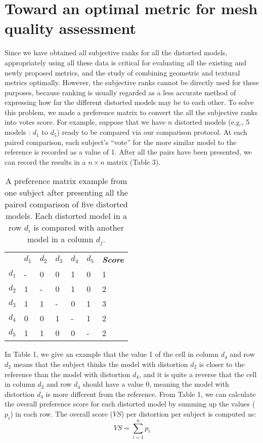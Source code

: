 \section{Toward an optimal metric for mesh quality assessment}
Since we have obtained all subjective ranks for all the distorted models, appropriately using all these data is critical for evaluating all the existing and newly proposed metrics, and the study of combining geometric and textural metrics optimally. However, the subjective ranks cannot be directly used for these purposes, because ranking is usually regarded as a less accurate method of expressing how far the different distorted models may be to each other.  To solve this problem, we made a preference matrix \cite{Ledda_2005} to convert the all the subjective ranks into votes score. For example, suppose that we have $n$ distorted models (e.g., 5 models : $d_1$ to $d_5$) ready to be compared via our comparison protocol.   At each paired comparison, each subject’s “vote” for the more similar model to the reference is recorded as a value of 1. After all the pairs have been presented, we can record the results in a $n \times n$ matrix (Table 3).
\begin{table}[]
\centering
\caption{A preference matrix example from one subject after presenting all the paired comparison of five distorted models. Each distorted model in a row $d_i$ is compared with another model in a column $d_j$.}
\label{my-label}
\begin{tabular}{lllllll}
            & $d_1$ & $d_2$ & $d_3$ & $d_4$ & $d_5$ & \textit{\textbf{Score}} \\
$d_1$ & -           & 0           & 0           & 1           & 0           & 1     \\
$d_2$ & 1           & -           & 0           & 1           & 0           & 2     \\
$d_3$ & 1           & 1           & -           & 0           & 1           & 3     \\
$d_4$ & 0           & 0           & 1           & -           & 1           & 2     \\
$d_5$ & 1           & 1           & 0           & 0           & -           & 2    
\end{tabular}
\end{table}
In Table 1, we give an example that the value 1 of the cell in column $d_4$ and row $d_2$ means that the subject thinks the model with distortion $d_2$ is closer to the reference than the model with distortion $d_4$, and it is quite a reverse that the cell in column $d_2$ and row $d_4$ should have a value 0, meaning the model with distortion $d_4$ is more different from the reference. From Table 1, we can calculate the overall preference score for each distorted model by summing up the values ($p_i$) in each row. The overall score ($VS$) per distortion per subject is computed as:
\begin{equation}
VS =\sum_{i=1}^n{p_i}
\end{equation}
